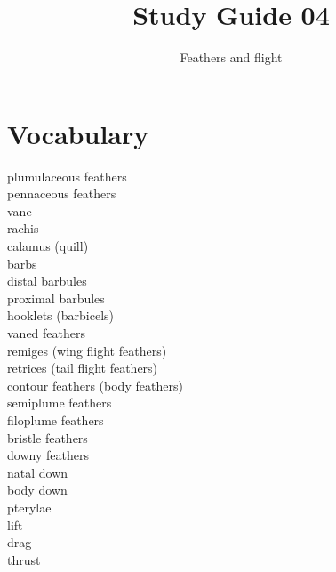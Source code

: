 \documentclass[nofonts, letterpaper]{tufte-handout}
\title{Study Guide 04}
\author{Feathers and flight}
\date{} %
\begin{document}
\maketitle	%


\section{Vocabulary}
\vspace{-1\baselineskip}
\begin{multicols}{2}
plumulaceous feathers \\
pennaceous feathers \\
vane \\
rachis \\
calamus (quill) \\
barbs  \\
distal barbules \\
proximal barbules \\
hooklets (barbicels) \\
vaned feathers \\
remiges (wing flight feathers) \\
retrices (tail flight feathers) \\
contour feathers (body feathers) \\
semiplume feathers\\
filoplume feathers\\
bristle feathers \\
downy feathers \\
natal down \\
body down \\
pterylae \\
lift \\
drag \\
thrust \\

\end{multicols}
\end{document}
